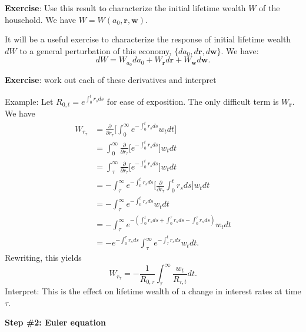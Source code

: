 \documentclass[11pt]{extarticle}
\theoremstyle{plain}
\theoremstyle{definition}
\begin{document}
\textbf{Exercise}: Use this result to characterize the initial lifetime wealth $W$ of the household. We have $W = W(a_0, \bm{r}, \bm{w})$. 


\vspace{5mm}
\noindent
It will be a useful exercise to characterize the response of initial lifetime wealth $dW$ to a general perturbation of this economy, $\{da_0, d \bm r, d \bm w\}$. We have:
\begin{equation*}
	dW = W_{a_0} da_0 + W_{\bm r} d \bm{r} + W_{ \bm w} d \bm w. 
\end{equation*}

\textbf{Exercise}: work out each of these derivatives and interpret 

Example: Let $R_{0,t} = e^{\int_0^t r_s ds }$ for ease of exposition. The only difficult term is $W_{\bm r}$. We have 
\begin{align*}
	W_{r_\tau} &= \frac{\partial }{\partial r_{\tau}} \bigg[ \int_0^\infty e^{- \int_0^t r_s ds }   w_t dt \bigg] \\
	&= \int_0^\infty \frac{\partial }{\partial r_{\tau}} \bigg[e^{- \int_0^t r_s ds } \bigg] w_t dt  \\
	&= \int_\tau^\infty \frac{\partial }{\partial r_{\tau}} \bigg[e^{- \int_0^t r_s ds } \bigg] w_t dt  \\
	&= - \int_\tau^\infty e^{- \int_0^t r_s ds } \bigg[ \frac{\partial }{\partial r_{\tau}} \int_0^t r_s ds \bigg] w_t dt  \\
	&= - \int_\tau^\infty e^{- \int_0^t r_s ds } w_t dt  \\
	&= - \int_\tau^\infty e^{- (\int_0^t r_s ds + \int_0^\tau r_s ds - \int_0^\tau r_s ds)} w_t dt  \\
	&= - e^{- \int_0^\tau r_s ds } \int_\tau^\infty e^{- \int_\tau^t r_s ds} w_t dt .
\end{align*}
Rewriting, this yields 
\begin{equation*}
	W_{r_\tau} = - \frac{1}{R_{0, \tau}} \int_\tau^\infty \frac{w_t}{R_{\tau, t}} dt.
\end{equation*}
Interpret: This is the effect on lifetime wealth of a change in interest rates at time $\tau$.

\vspace{5mm}
\noindent
\textbf{Step \#2: Euler equation}
\end{document}
